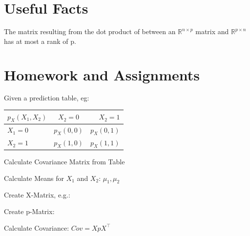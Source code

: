 \documentclass[english]{latex4ei/latex4ei_sheet}
\begin{document}
\vspace{100}
\section{Useful Facts}
The matrix resulting from the dot product of between an $\mathbb{R}^{n \times p}$ matrix and $\mathbb{R}^{p \times n}$ has at most a rank of p.


\newpage
\section{Homework and Assignments}
Given a prediction table, eg:
\begin{tabular}{l|c|r}
    $p_X(X_1,X_2)$& $X_2=0$ & $X_2=1$ \\
    \hline
     $X_1=0$& $p_X(0,0)$& $p_X(0,1)$ \\
     \hline
     $X_2=1$& $p_X(1,0)$& $p_X(1,1)$
\end{tabular}
    \begin{cookbox}{Calculate Covariance Matrix from Table}
            \item Calculate Means for $X_1$ and $X_2$: $\mu_1, \mu_2$
            \item Create X-Matrix, e.g.: 
            \item Create p-Matrix: 
            \item Calculate Covariance: $Cov=XpX^{\top}$
    \end{cookbox}
\end{document}
